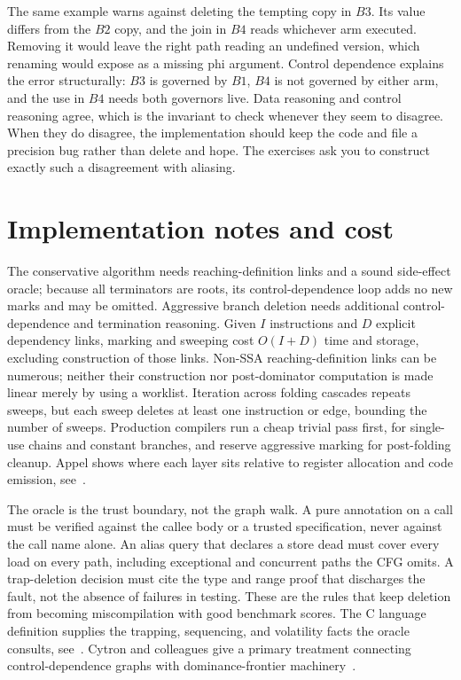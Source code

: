 The same example warns against deleting the tempting  copy in $B3$.
Its value differs from the $B2$ copy, and the join in $B4$ reads whichever arm executed.
Removing it would leave the right path reading an undefined version, which renaming would expose as a missing phi argument.
Control dependence explains the error structurally: $B3$ is governed by $B1$, $B4$ is not governed by either arm, and the use in $B4$ needs both governors live.
Data reasoning and control reasoning agree, which is the invariant to check whenever they seem to disagree.
When they do disagree, the implementation should keep the code and file a precision bug rather than delete and hope.
The exercises ask you to construct exactly such a disagreement with aliasing.

\section{Implementation notes and cost}
\label{sec:ch15-implementation}

The conservative algorithm needs reaching-definition links and a sound side-effect oracle; because all terminators are roots, its control-dependence loop adds no new marks and may be omitted.
Aggressive branch deletion needs additional control-dependence and termination reasoning.
Given $I$ instructions and $D$ explicit dependency links, marking and sweeping cost $O(I+D)$ time and storage, excluding construction of those links.
Non-SSA reaching-definition links can be numerous; neither their construction nor post-dominator computation is made linear merely by using a worklist.
Iteration across folding cascades repeats sweeps, but each sweep deletes at least one instruction or edge, bounding the number of sweeps.
Production compilers run a cheap trivial pass first, for single-use chains and constant branches, and reserve aggressive marking for post-folding cleanup.
Appel shows where each layer sits relative to register allocation and code emission, see~\cite{appel-1998-modern}.

The oracle is the trust boundary, not the graph walk.
A pure annotation on a call must be verified against the callee body or a trusted specification, never against the call name alone.
An alias query that declares a store dead must cover every load on every path, including exceptional and concurrent paths the CFG omits.
A trap-deletion decision must cite the type and range proof that discharges the fault, not the absence of failures in testing.
These are the rules that keep deletion from becoming miscompilation with good benchmark scores.
The C language definition supplies the trapping, sequencing, and volatility facts the oracle consults, see~\cite{wg14-2011-c11}.
Cytron and colleagues give a primary treatment connecting control-dependence graphs with dominance-frontier machinery~\cite{cytron-1991-ssa}.

